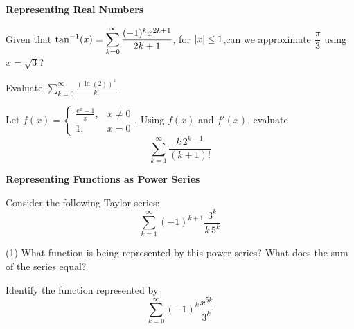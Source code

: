 \documentclass[../mathNotesPreamble]{subfiles}
\begin{document}
    \textbf{Representing Real Numbers}
      \begin{ex*}[\textcolor{blue}{LC 31.7}]
        Given that $\displaystyle\tan^{-1}(x)=\sum_{k=0}^\infty \frac{(-1)^k x^{2k+1}}{2k+1}$, for ${\left\vert x\right\vert}\leq 1$,\newline can we approximate $\dfrac{\pi}{3}$ using $x=\sqrt{3}$?
      \end{ex*}

      \begin{ex*}[\textcolor{blue}{LC 31.8}]
        Evaluate $\displaystyle \sum_{k=0}^\infty \frac{(\ln(2))^k}{k!}$.
      \end{ex*}
      \pagebreak

      \begin{ex*}
        Let $f(x)=\begin{cases}
          \frac{e^x-1}{x},& x\neq 0\\
          1,& x=0
        \end{cases}$. Using $f(x)$ and $f'(x)$, evaluate 
          \[\sum_{k=1}^\infty \frac{k\,2^{k-1}}{(k+1)!}\]
      \end{ex*}
      \pagebreak

    \textbf{Representing Functions as Power Series}
      \begin{ex*}[\textcolor{blue}{LC 31.9-31.10}]
        Consider the following Taylor series:
          \[\sum_{k=1}^\infty (-1)^{k+1}\frac{3^k}{k\,5^k}\]
      \end{ex*}
      \begin{tasks}[after-item-skip=\stretch{1}, label=,item-indent=0pt](1)
        \task What function is being represented by this power series?
        \task What does the sum of the series equal?
      \end{tasks}
      \pagebreak

      \begin{ex*}
        Identify the function represented by  
          \[\sum_{k=0}^\infty (-1)^k \frac{x^{5k}}{3^k}\]
      \end{ex*}
      \pagebreak

    
\end{document}
